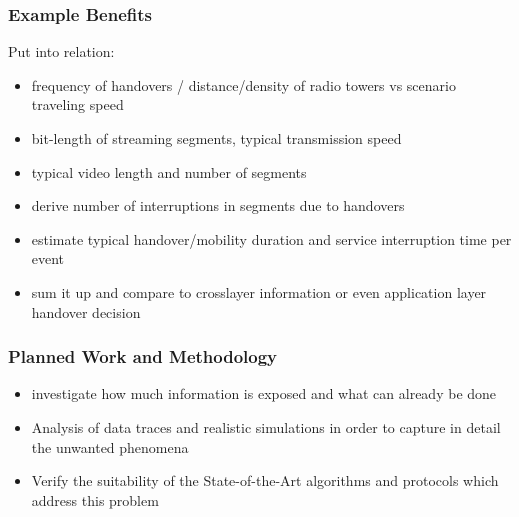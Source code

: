 \subsubsection{Example Benefits}

Put into relation:

\begin{itemize}
	\item frequency of handovers / distance/density of radio towers vs scenario traveling speed
	\item bit-length of streaming segments, typical transmission speed
	\item typical video length and number of segments
	\item derive number of interruptions in segments due to handovers
	\item estimate typical handover/mobility duration and service interruption time per event
	\item sum it up and compare to crosslayer information or even application layer handover decision

\end{itemize}


\subsubsection{Planned Work and Methodology}

\begin{itemize}
	\item investigate how much information is exposed and what can already be done
	\item Analysis of data traces and realistic simulations in order to capture in detail the unwanted phenomena
	\item Verify the suitability of the State-of-the-Art algorithms and protocols which address this problem
\end{itemize}









